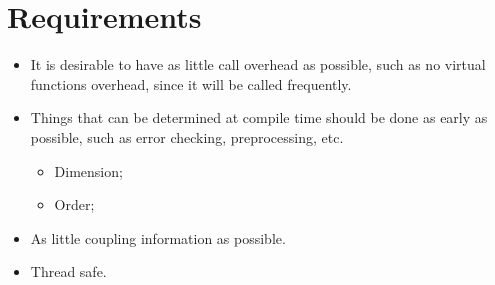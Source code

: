 \section{Requirements}
\begin{itemize}
\item It is desirable to have as little call overhead as possible, such as
  no virtual functions overhead, since it will be called frequently.
\item Things that can be determined at compile time should be done as early as possible, such as error checking, preprocessing, etc.
  \begin{itemize}
  \item Dimension;
  \item Order;
  \end{itemize}
\item As little coupling information as possible.
\item Thread safe.
\end{itemize}
